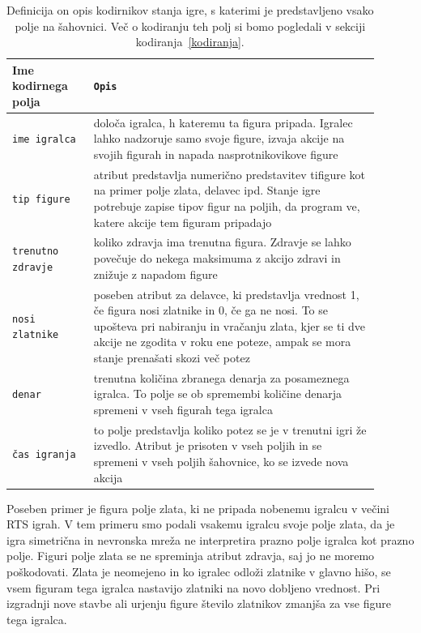\documentclass[a4paper, 12pt]{book}
\begin{document}
\begin{table}
	\begin{center}
		\begin{tabular}{p{0.2\linewidth}|p{0.7\linewidth}}
			Ime kodirnega polja    & {\tt Opis} \\ \hline
			{\tt ime igralca}      & določa igralca, h kateremu ta figura pripada. 
									 Igralec lahko nadzoruje samo svoje figure, izvaja akcije na svojih figurah in napada nasprotnikovikove figure \\
			{\tt tip figure}       & atribut predstavlja numerično predstavitev tifigure kot na primer polje zlata, delavec ipd.
									 Stanje igre potrebuje zapise tipov figur na poljih, da program ve, katere akcije tem figuram pripadajo\\
			{\tt trenutno zdravje} & koliko zdravja ima trenutna figura. 
									 Zdravje se lahko povečuje do nekega maksimuma z akcijo zdravi in znižuje z napadom figure \\
			{\tt nosi zlatnike}    & poseben atribut za delavce, ki predstavlja vrednost 1, če figura nosi zlatnike in 0, če ga ne nosi. 
									 To se upošteva pri nabiranju in vračanju zlata, kjer se ti dve akcije ne zgodita v roku ene poteze, ampak se mora stanje prenašati skozi več potez \\
			{\tt denar}            & trenutna količina zbranega denarja za posameznega igralca. 
									 To polje se ob spremembi količine denarja spremeni v vseh figurah tega igralca \\
			{\tt čas igranja}      & to polje predstavlja koliko potez se je v trenutni igri že izvedlo. 
									 Atribut je prisoten v vseh poljih in se spremeni v vseh poljih šahovnice, ko se izvede nova akcija \\
		\end{tabular}
	\end{center}
	\caption{Definicija on opis kodirnikov stanja igre, s katerimi je predstavljeno vsako polje na šahovnici. Več o kodiranju teh polj si bomo pogledali v sekciji kodiranja~\ref{kodiranja}.}
	\label{tableEncoders}
\end{table}

Poseben primer je figura polje zlata, ki ne pripada nobenemu igralcu v večini RTS igrah. 
V tem primeru smo podali vsakemu igralcu svoje polje zlata, da je igra simetrična in nevronska mreža ne interpretira prazno polje igralca kot prazno polje.
Figuri polje zlata se ne spreminja atribut zdravja, saj jo ne moremo poškodovati. 
Zlata je neomejeno in ko igralec odloži zlatnike v glavno hišo, se vsem figuram tega igralca nastavijo zlatniki na novo dobljeno vrednost. 
Pri izgradnji nove stavbe ali urjenju figure število zlatnikov zmanjša za vse figure tega igralca.
\end{document}
